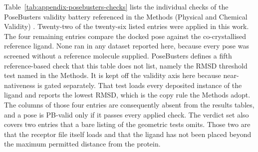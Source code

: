 Table~\ref{tab:appendix-posebusters-checks} lists the individual checks of the PoseBusters validity battery referenced in the Methods (Physical and Chemical Validity) \cite{ref035}. Twenty-two of the twenty-six listed entries were applied in this work. The four remaining entries compare the docked pose against the co-crystallised reference ligand. None ran in any dataset reported here, because every pose was screened without a reference molecule supplied. PoseBusters defines a fifth reference-based check that this table does not list, namely the RMSD threshold test named in the Methods. It is kept off the validity axis here because near-nativeness is gated separately. That test loads every deposited instance of the ligand and reports the lowest RMSD, which is the copy rule the Methods adopt. The columns of those four entries are consequently absent from the results tables, and a pose is PB-valid only if it passes every applied check. The verdict set also covers two entries that a bare listing of the geometric tests omits. Those two are that the receptor file itself loads and that the ligand has not been placed beyond the maximum permitted distance from the protein.

